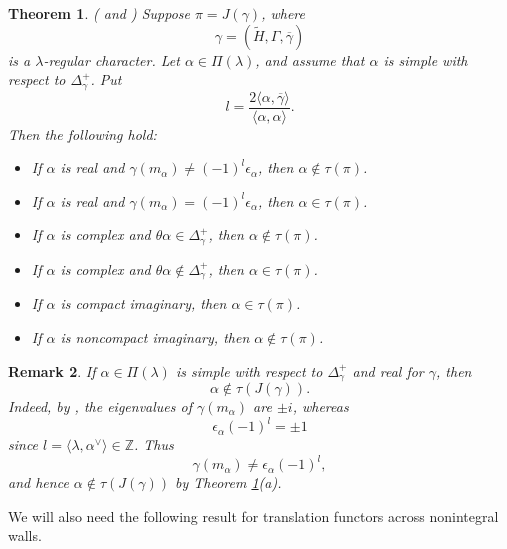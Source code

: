 \documentclass{amsart}
\newcommand{\ep}{{\epsilon}}
\newcommand{\bbZ}{{\mathbb Z}}
\newtheorem{thm}{Theorem}[section]
\newtheorem{remark}[thm]{Remark}
\theoremstyle{definition}
\begin{document}
\begin{thm}\label{t:tau}
\emph{(\cite[Theorem 4.12]{V79c} and \cite[Theorem 12.5]{H90})}
Suppose $\pi=J(\gamma)$, where
\begin{equation*}
\gamma=(\widetilde H,\Gamma,\overline\gamma)
\end{equation*}
is a $\lambda$-regular character. Let $\alpha\in\Pi(\lambda)$, and assume that $\alpha$ is simple with respect to $\Delta_\gamma^+$. Put
\begin{equation*}
l=
\frac{2\langle\alpha,\overline\gamma\rangle}
{\langle\alpha,\alpha\rangle}.
\end{equation*}
Then the following hold:
\begin{itemize}
\item[(a)] If $\alpha$ is real and $\gamma(m_\alpha)\neq (-1)^l\ep_\alpha$, then $\alpha\notin\tau(\pi)$.
\item[(b)] If $\alpha$ is real and $\gamma(m_\alpha)=(-1)^l\ep_\alpha$, then $\alpha\in\tau(\pi)$.
\item[(c)] If $\alpha$ is complex and $\theta\alpha\in\Delta_\gamma^+$, then $\alpha\notin\tau(\pi)$.
\item[(d)] If $\alpha$ is complex and $\theta\alpha\notin\Delta_\gamma^+$, then $\alpha\in\tau(\pi)$.
\item[(e)] If $\alpha$ is compact imaginary, then $\alpha\in\tau(\pi)$.
\item[(f)] If $\alpha$ is noncompact imaginary, then $\alpha\notin\tau(\pi)$.
\end{itemize}
\end{thm}

\begin{remark}
If $\alpha\in\Pi(\lambda)$ is simple with respect to $\Delta_\gamma^+$ and real for $\gamma$, then
\begin{equation*}
\alpha\notin\tau(J(\gamma)).
\end{equation*}
Indeed, by \cite[Lemma 6.8]{RT05}, the eigenvalues of $\gamma(m_\alpha)$ are $\pm i$, whereas
\begin{equation*}
\ep_\alpha(-1)^l=\pm 1
\end{equation*}
since $l=\langle\lambda,\alpha^\vee\rangle\in\bbZ$. Thus
\begin{equation*}
\gamma(m_\alpha)\neq \ep_\alpha(-1)^l,
\end{equation*}
and hence $\alpha\notin\tau(J(\gamma))$ by Theorem \ref{t:tau}(a).
\end{remark}

We will also need the following result for translation functors across nonintegral walls.
\end{document}
